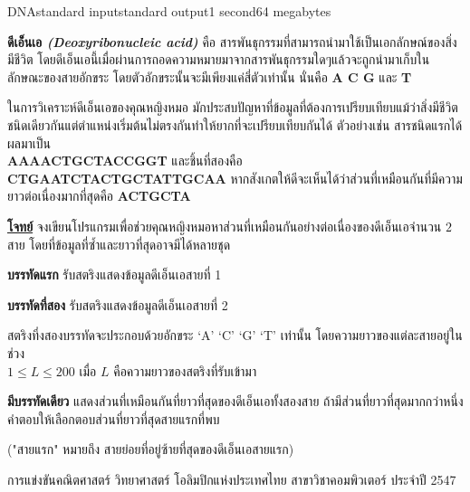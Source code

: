 \documentclass[11pt,a4paper]{article}
\begin{document}
\begin{problem}{DNA}{standard input}{standard output}{1 second}{64 megabytes}

\textbf{ดีเอ็นเอ \textit{(Deoxyribonucleic acid)}} คือ สารพันธุกรรมที่สามารถนำมาใช้เป็นเอกลักษณ์ของสิ่งมีชีวิต โดยดีเอ็นเอนี้เมื่อผ่านการถอดความหมายมาจากสารพันธุกรรมใดๆแล้วจะถูกนำมาเก็บในลักษณะของสายอักขระ โดยตัวอักขระนั้นจะมีเพียงแค่สี่ตัวเท่านั้น นั่นคือ \textbf{A C G} และ \textbf{T}

ในการวิเคราะห์ดีเอ็นเอของคุณหญิงหมอ มักประสบปัญหาที่ข้อมูลที่ต้องการเปรียบเทียบแม้ว่าสิ่งมีชีวิตชนิดเดียวกันแต่ตำแหน่งเริ่มต้นไม่ตรงกันทำให้ยากที่จะเปรียบเทียบกันได้ ตัวอย่างเช่น สารชนิดแรกได้ผลมาเป็น \\\textbf{AAAACTGCTACCGGT} และชิ้นที่สองคือ \textbf{CTGAATCTACTGCTATTGCAA} หากสังเกตให้ดีจะเห็นได้ว่าส่วนที่เหมือนกันที่มีความยาวต่อเนื่องมากที่สุดคือ \textbf{ACTGCTA}

\bigskip
\underline{\textbf{โจทย์}} จงเขียนโปรแกรมเพื่อช่วยคุณหญิงหมอหาส่วนที่เหมือนกันอย่างต่อเนื่องของดีเอ็นเอจำนวน $2$ สาย โดยที่ข้อมูลที่ซ้ำและยาวที่สุดอาจมีได้หลายชุด

\InputFile

\textbf{บรรทัดแรก} รับสตริงแสดงข้อมูลดีเอ็นเอสายที่ 1

\textbf{บรรทัดที่สอง} รับสตริงแสดงข้อมูลดีเอ็นเอสายที่ 2

สตริงที่งสองบรรทัดจะประกอบด้วยอักขระ ‘A’ ‘C’ ‘G’ ‘T’ เท่านั้น โดยความยาวของแต่ละสายอยู่ในช่วง\\ $1 \leq L \leq 200$ เมื่อ $L$ คือความยาวของสตริงที่รับเข้ามา

\OutputFile
\textbf{มีบรรทัดเดียว} แสดงส่วนที่เหมือนกันที่ยาวที่สุดของดีเอ็นเอทั้งสองสาย ถ้ามีส่วนที่ยาวที่สุดมากกว่าหนึ่งคำตอบให้เลือกตอบส่วนที่ยาวที่สุดสายแรกที่พบ

("สายแรก" หมายถึง สายย่อยที่อยู่ซ้ายที่สุดของดีเอ็นเอสายแรก)

\Examples

\begin{example}
%
\end{example}


\Source

การแข่งขันคณิตศาสตร์ วิทยาศาสตร์ โอลิมปิกแห่งประเทศไทย สาขาวิชาคอมพิวเตอร์ ประจำปี 2547

\end{problem}
\end{document}
